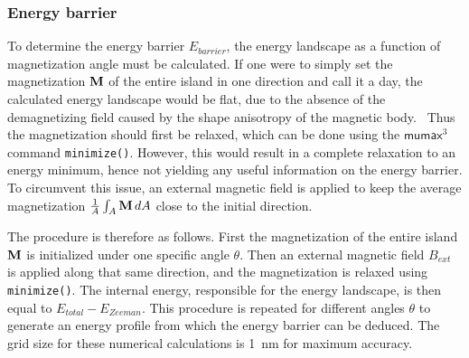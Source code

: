 \documentclass[10pt,a4paper]{article}
\newcommand{\code}[1]{\texttt{#1}}
\newcommand{\mumax}{$\mathsf{mumax}^3$}
\begin{document}
\subsubsection{Energy barrier}
To determine the energy barrier $E_{barrier}$, the energy landscape as a function of magnetization angle must be calculated. If one were to simply set the magnetization $\vb{M}$ of the entire island in one direction and call it a day, the calculated energy landscape would be flat, due to the absence of the demagnetizing field caused by the shape anisotropy of the magnetic body.~\cite{Nonmonotonic_reversal} Thus the magnetization should first be relaxed, which can be done using the \mumax{} command \code{minimize()}. However, this would result in a complete relaxation to an energy minimum, hence not yielding any useful information on the energy barrier. To circumvent this issue, an external magnetic field is applied to keep the average magnetization $\frac{1}{A}\int_A \vb{M}\,dA$ close to the initial direction. \par
The procedure is therefore as follows. First the magnetization of the entire island $\vb{M}$ is initialized under one specific angle $\theta$. Then an external magnetic field $B_{ext}$ is applied along that same direction, and the magnetization is relaxed using \code{minimize()}. The internal energy, responsible for the energy landscape, is then equal to $E_{total} - E_{Zeeman}$. This procedure is repeated for different angles $\theta$ to generate an energy profile from which the energy barrier can be deduced. The grid size for these numerical calculations is \SI{1}{\nano\metre} for maximum accuracy.
\end{document}
